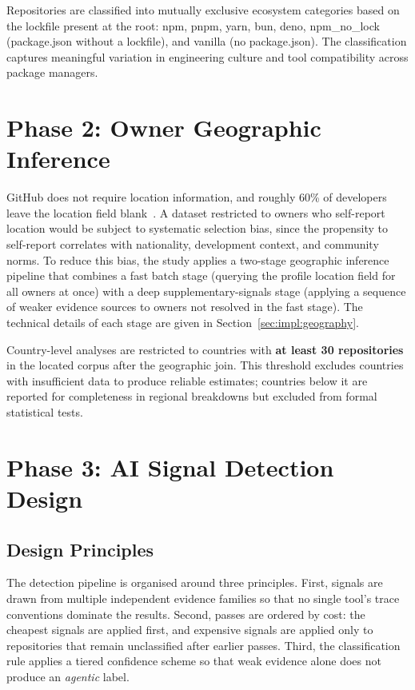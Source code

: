 Repositories are classified into mutually exclusive ecosystem categories based on the lockfile present at the root: npm, pnpm, yarn, bun, deno, npm\_no\_lock (package.json without a lockfile), and vanilla (no package.json). The classification captures meaningful variation in engineering culture and tool compatibility across package managers.

\section{Phase 2: Owner Geographic Inference}
\label{sec:meth:geography}

GitHub does not require location information, and roughly 60\% of developers leave the location field blank~\cite{wachs2022}. A dataset restricted to owners who self-report location would be subject to systematic selection bias, since the propensity to self-report correlates with nationality, development context, and community norms. To reduce this bias, the study applies a two-stage geographic inference pipeline that combines a fast batch stage (querying the profile location field for all owners at once) with a deep supplementary-signals stage (applying a sequence of weaker evidence sources to owners not resolved in the fast stage). The technical details of each stage are given in Section~\ref{sec:impl:geography}.

Country-level analyses are restricted to countries with \textbf{at least 30 repositories} in the located corpus after the geographic join. This threshold excludes countries with insufficient data to produce reliable estimates; countries below it are reported for completeness in regional breakdowns but excluded from formal statistical tests.

\section{Phase 3: AI Signal Detection Design}
\label{sec:meth:detection}

\subsection{Design Principles}

The detection pipeline is organised around three principles. First, signals are drawn from multiple independent evidence families so that no single tool's trace conventions dominate the results. Second, passes are ordered by cost: the cheapest signals are applied first, and expensive signals are applied only to repositories that remain unclassified after earlier passes. Third, the classification rule applies a tiered confidence scheme so that weak evidence alone does not produce an \emph{agentic} label.


